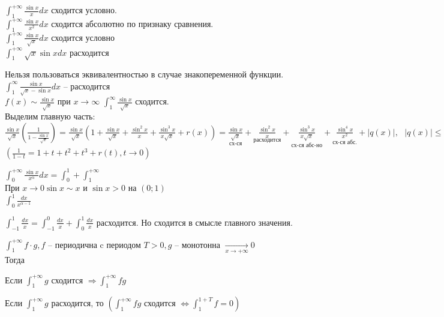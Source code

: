 \begin{Example}
\begin{MyList}
		\item $\displaystyle \int_{1}^{+\infty} \frac{\sin x}{x} dx$ сходится условно.\\
		$\displaystyle \int_{1}^{+\infty} \frac{\sin x}{x^2} dx$ сходится абсолютно по признаку сравнения.\\ 
		$\displaystyle \int_{1}^{+\infty} \frac{\sin x}{\sqrt{x}} dx$ сходится условно\\
		$\displaystyle \int_{1}^{+\infty} \sqrt{x} \sin x dx$ расходится	
		\item Нельзя пользоваться эквивалентностью в случае знакопеременной функции.\\
		$\displaystyle \int_{1}^{\infty} \frac{\sin x}{\sqrt{x} - \sin x} dx$ -- расходится\\
		$\displaystyle f(x) \sim \frac{\sin x}{\sqrt{x}}$ при $\displaystyle x \to \infty$ 
		$\displaystyle\int_{1}^{\infty} \frac{\sin x}{\sqrt{x}} $ сходится.\\ 
		Выделим главную часть: $\displaystyle \frac{\sin x}{\sqrt{x}} \left( \frac{1}{1 - \frac{\sin x}{\sqrt{x}}}  \right) = 
		\frac{\sin x}{\sqrt{x}} (1 + \frac{\sin x}{\sqrt{x}} + \frac{\sin^2 x}{x} + \frac{\sin^3 x}{x\sqrt{x}} + r(x)) =
		\underset{\text{сх-ся}}{\frac{\sin x}{\sqrt{x}}} + \underset{\text{расходится}}{\frac{\sin^2 x}{x}} +
		\underset{\text{сх-ся абс-но}}{\frac{\sin^3 x}{x\sqrt{x}}} + \underset{\text{сх-ся абс.}}{\frac{\sin^4 x}{x^2}} + |q(x)|, \ \ \ |q(x)| \leqslant \frac{c}{x^2}$\\
		$\displaystyle \left(\frac{1}{1-t} = 1 + t + t^2 + t^3 + r(t), t \to 0\right)$
		\item $\displaystyle \int_{0}^{+\infty} \frac{\sin x}{x^{\alpha}}dx = \int_{0}^{1} + \int_{1}^{+\infty} $\\
		При $x \to 0 \sin x \sim x$  и $\sin x > 0$ на $(0;1)$\\
		$\displaystyle \int_{0}^{1} \frac{dx}{x^{\alpha -1}}$
		\item $\displaystyle \int_{-1}^{1} \frac{dx}{x} = \int_{-1}^{0} \frac{dx}{x} + \int_{0}^{1} \frac{dx}{x}$ расходится.
		Но сходится в смысле главного значения.
	\end{MyList}
\end{Example}

\begin{Rem}
	$\displaystyle \int_{1}^{+\infty} f \cdot g, f$ -- периодична c периодом $T > 0, g$ -- монотонна $\underset{x \to + \infty}{\to} 0$\\
	Тогда 
	\begin{MyList}
		\item Если $\displaystyle \int_{1}^{+\infty} g$ сходится $\displaystyle \Rightarrow \int_{1}^{+\infty} fg$
		\item Если $\displaystyle \int_{1}^{+\infty} g$ расходится, то 
		$\displaystyle \left(\int_{1}^{+\infty} fg \text{ сходится } \Leftrightarrow \int_{1}^{1+T} f = 0 \right)$
	\end{MyList}
\end{Rem}


